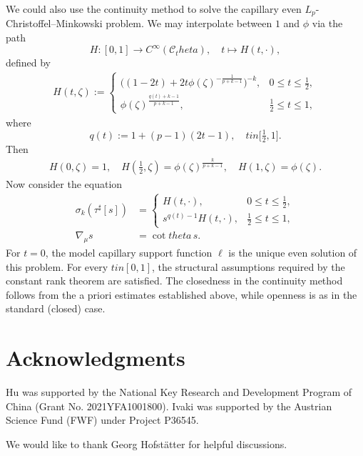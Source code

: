 \documentclass[12pt]{amsart}
\def\theta{theta}%
\def\in{in }%
\numberwithin{equation}{section}
\newcommand{\8}{\infty}
\newcommand{\cC}{\mathcal{C}}
\newcommand{\eq}[1]{\begin{equation}\begin{alignedat}{2}#1\end{alignedat}\end{equation}}
\newcommand{\Cth}{\cC_\theta}
\begin{document}
\begin{rem}
We could also use the continuity method to solve the capillary even $L_p$-Christoffel--Minkowski problem. We may interpolate between $1$ and $\phi$ via the path
\[
  H : [0,1] \to C^\infty(\Cth), \quad t \mapsto H(t,\cdot),
\]
defined by
\eq{
H(t,\zeta)
:=
\begin{cases}
\bigl((1-2t)+2t\phi(\zeta)^{-\frac{1}{p+k-1}}\bigr)^{-k},
  & 0\le t\le \tfrac12,\\[0.6em]
\phi(\zeta)^{\frac{q(t)+k-1}{p+k-1}},
  & \tfrac12\le t\le 1,
\end{cases}
}
where
\[
q(t):=1+(p-1)(2t-1),\quad t\in\bigl[\tfrac12,1\bigr].
\]
Then
\eq{
H(0,\zeta)=1,\quad
H\!\left(\tfrac12,\zeta\right)=\phi(\zeta)^{\frac{k}{p+k-1}},\quad
H(1,\zeta)=\phi(\zeta).
}
Now consider the equation
\eq{\label{eq:continuity-method}
\sigma_k(\tau^{\sharp}[s])&=
\begin{cases}
H(t,\cdot),
  & 0\le t\le \tfrac12,\\
s^{q(t)-1}H(t,\cdot),
  & \tfrac12\le t\le 1,
\end{cases}\\
\nabla_{\mu}s&=\cot\theta\, s.
}
For $t=0$, the model capillary support function $\ell$ is the unique even solution of this problem. For every $t\in[0,1]$, the structural assumptions required by the constant rank theorem are satisfied. The closedness in the continuity method follows from the a priori estimates established above, while openness is as in the standard (closed) case.
\end{rem}


\section*{Acknowledgments}
Hu was supported by the National Key Research and Development Program of China (Grant No. 2021YFA1001800). Ivaki was supported by the Austrian Science Fund (FWF) under Project P36545. 

We would like to thank Georg Hofst\"{a}tter for helpful discussions. 
\end{document}
